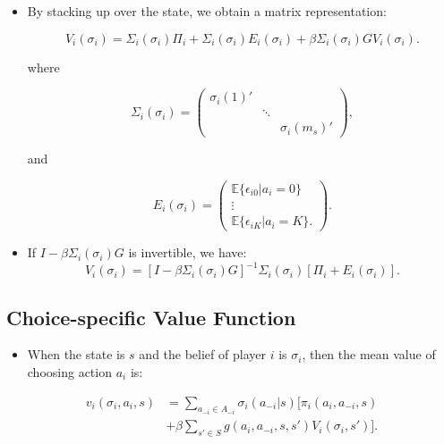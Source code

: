 \documentclass[]{book}
\providecommand{\tightlist}{%
  \setlength{\itemsep}{0pt}\setlength{\parskip}{0pt}}
\begin{document}
\begin{itemize}
\tightlist
\item
  By stacking up over the state, we obtain a matrix representation:

  \begin{equation}
  V_i(\sigma_i) = \Sigma_i(\sigma_i) \Pi_i + \Sigma_i(\sigma_i) E_i(\sigma_i) + \beta \Sigma_i(\sigma_i) G V_i(\sigma_i).
  \end{equation}

  where

  \begin{equation}
  \Sigma_i(\sigma_i) = 
  \begin{pmatrix}
  \sigma_i(1)' & & \\
  & \ddots & \\
  & & \sigma_i(m_s)'
  \end{pmatrix},
  \end{equation}

  and

  \begin{equation}
  E_i(\sigma_i) = 
  \begin{pmatrix}
  \mathbb{E}\{\epsilon_{i0}|a_i = 0\}\\
  \vdots\\
  \mathbb{E}\{\epsilon_{iK}|a_i = K\}.
  \end{pmatrix}.
  \end{equation}
\item
  If \(I - \beta \Sigma_i(\sigma_i)G\) is invertible, we have: \[
  V_i(\sigma_i) = [I - \beta \Sigma_i(\sigma_i)G]^{-1}\Sigma_i(\sigma_i)[\Pi_i + E_i(\sigma_i)].
  \]
\end{itemize}

\subsection{Choice-specific Value
Function}\label{choice-specific-value-function-1}

\begin{itemize}
\tightlist
\item
  When the state is \(s\) and the belief of player \(i\) is
  \(\sigma_i\), then the mean value of choosing action \(a_i\) is:
\end{itemize}

\begin{equation}
\begin{split}
v_i(\sigma_i, a_i, s) &= \sum_{a_{-i} \in A_{-i}} \sigma_i(a_{-i}|s)[ \pi_i(a_i, a_{-i}, s) \\
&+ \beta \sum_{s' \in S} g(a_i, a_{-i}, s, s') V_i(\sigma_i, s')].
\end{split}
\end{equation}
\end{document}
